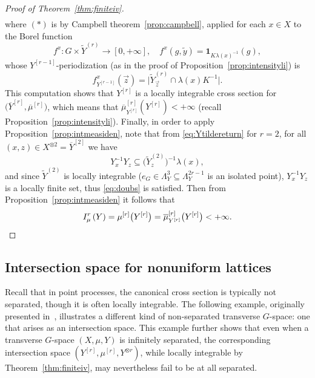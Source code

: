 \documentclass{amsart}
\numberwithin{equation}{subsection}
\theoremstyle{remark}
\begin{document}
\begin{proof}[Proof of Theorem~\ref{thm:finiteiv}]
\begin{align*}
\end{align*}
where \(\left(\ast\right)\) is by Campbell theorem~\ref{prop:campbell}, applied for each \(x\in X\) to the Borel function
\[f^{x}:G\times\widetilde{Y}^{\left(r\right)}\longrightarrow\left[0,+\infty\right],\quad f^{x}\left(g,\widetilde{y}\right)=\mathbf{1}_{K\lambda\left(x\right)^{-1}}\left(g\right),\]
whose \(Y^{\left[r-1\right]}\)-periodization (as in the proof of Proposition~\ref{prop:intensityli}) is
\[f_{Y^{\left[r-1\right]}}^{x}\left(\vec{z}\right)=\big|\widetilde{Y}_{\vec{z}}^{\left(r\right)}\cap\lambda\left(x\right)K^{-1}\big|.\]
This computation shows that \(Y^{\left[r\right]}\) is a locally integrable cross section for \(\big(\overline{Y}^{\left[r\right]},\overline{\mu}^{\left[r\right]}\big)\), which means that \(\overline{\mu}_{Y^{\left[r\right]}}^{\left[r\right]}\left(Y^{\left[r\right]}\right)<+\infty\) (recall Proposition~\ref{prop:intensityli}). Finally, in order to apply Proposition~\ref{prop:intmeasiden}, note that from \eqref{eq:Ytildereturn} for \(r=2\), for all \(\left(x,z\right)\in X^{\otimes 2}=\overline{Y}^{\left[2\right]}\) we have
\[Y_{x}^{-1}Y_{z}\subseteq\big(\widetilde{Y}_{z}^{\left(2\right)}\big)^{-1}\lambda\left(x\right),\]
and since \(\widetilde{Y}^{\left(2\right)}\) is locally integrable (\(e_{G}\in\Lambda_{Y}^{3}\subseteq\Lambda_{Y}^{2r-1}\) is an isolated point), \(Y_{x}^{-1}Y_{z}\) is a locally finite set, thus \eqref{eq:doubs} is satisfied. Then from Proposition~\ref{prop:intmeasiden} it follows that
\[I_{\mu}^{r}\left(Y\right)=\mu^{\left[r\right]}\big(Y^{\left[r\right]}\big)=\overline{\mu}_{Y^{\left[r\right]}}^{\left[r\right]}\big(Y^{\left[r\right]}\big)<+\infty.\qedhere\]
\end{proof}

\subsection{Intersection space for nonuniform lattices}\label{sct:nonunif}

Recall that in point processes, the canonical cross section is typically not separated, though it is often locally integrable. The following example, originally presented in~\cite[Example 7.3]{bjorklund2025int}, illustrates a different kind of non-separated transverse \(G\)-space: one that arises as an intersection space. This example further shows that even when a transverse \(G\)-space \(\left(X,\mu,Y\right)\) is infinitely separated, the corresponding intersection space \(\left(Y^{\left[r\right]},\mu^{\left[r\right]},Y^{\otimes r}\right)\), while locally integrable by Theorem~\ref{thm:finiteiv}, may nevertheless fail to be at all separated.
\end{document}
